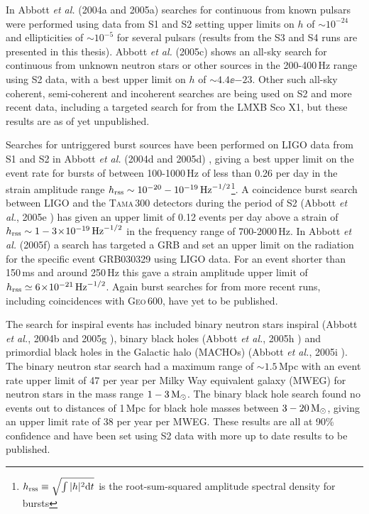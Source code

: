 In Abbott {\it et al.} (2004a and 2005a) \cite{Abbott:2004, Abbott:2005} searches for continuous
\gws from known pulsars were performed using data from S1 and S2 setting upper limits on $h$ of
$\sim 10^{-24}$ and ellipticities of $\sim 10^{-5}$ for several pulsars (results from the S3 and S4
runs are presented in this thesis). Abbott {\it et al.} (2005c) \cite{Abbott3:2005} shows an all-sky
search for continuous \gws from unknown neutron stars or other sources in the 200-400\,Hz range
using S2 data, with a best upper limit on $h$ of $\sim 4.4\ee{-23}$. Other such all-sky coherent,
semi-coherent and incoherent searches are being used on S2 and more recent data, including a
targeted search for \gws from the LMXB Sco X1, but these results are as of yet unpublished.

Searches for untriggered burst sources have been performed on LIGO data from S1 and S2 in Abbott
{\it et al.} (2004d and 2005d) \cite{Abbott4:2004, Abbott4:2005}, giving a best upper limit on the
event rate for bursts of between 100-1000\,Hz of less than 0.26 per day in the strain amplitude
range $h_{\rm rss} \sim 10^{-20}-10^{-19}\,{\rm Hz}^{-1/2}$\footnote{$h_{\rm rss} \equiv
\sqrt{\int|h|^2 {\rm d}t}$ is the root-sum-squared amplitude spectral density for bursts}. A
coincidence burst search between LIGO and the T\textsc{ama}\,300 detectors during the period of S2
(Abbott {\it et al.}, 2005e \cite{Abbott5:2005}) has given an upper limit of 0.12 events per day
above a strain of $h_{\rm rss} \sim 1-3\!\times\!10^{-19}\,{\rm Hz}^{-1/2}$ in the frequency range of
700-2000\,Hz. In Abbott {\it et al.} (2005f) \cite{Abbott6:2005} a search has targeted a GRB and set
an upper limit on the radiation for the specific event GRB030329 using LIGO data. For an event
shorter than 150\,ms and around 250\,Hz this gave a strain amplitude upper limit of $h_{\rm rss}
\simeq 6\!\times\!10^{-21}\,{\rm Hz}^{-1/2}$. Again burst searches for \gws from more recent runs, including
coincidences with G\textsc{eo}\,600, have yet to be published.

The search for inspiral events has included binary neutron stars inspiral (Abbott {\it et al.},
2004b and 2005g \cite{Abbott2:2004, Abbott7:2005}), binary black holes (Abbott {\it et al.}, 2005h
\cite{Abbott8:2005}) and primordial black holes in the Galactic halo (MACHOs) (Abbott {\it et al.},
2005i \cite{Abbott9:2005}). The binary neutron star search had a maximum range of $\sim 1.5$\,Mpc
with an event rate upper limit of 47 per year per Milky Way equivalent galaxy (MWEG) for neutron
stars in the mass range $1-3\,{\rm M}_{\odot}$. The binary black hole search found no events out to
distances of 1\,Mpc for black hole masses between $3-20\,{\rm M}_{\odot}$, giving an upper limit
rate of 38 per year per MWEG. These results are all at 90\% confidence and have been set using S2
data with more up to date results to be published.

